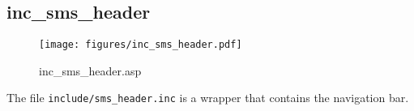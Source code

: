 \subsection{inc\_sms\_header}
\begin{figure}[htb]
    \begin{center}
        \texttt{[image: figures/inc\_sms\_header.pdf]}
    \end{center}
    \caption{inc\_sms\_header.asp}
    \label{fig:inc_sms_header}
\end{figure}

The file \verb|include/sms_header.inc| is a wrapper that contains the navigation
bar.

